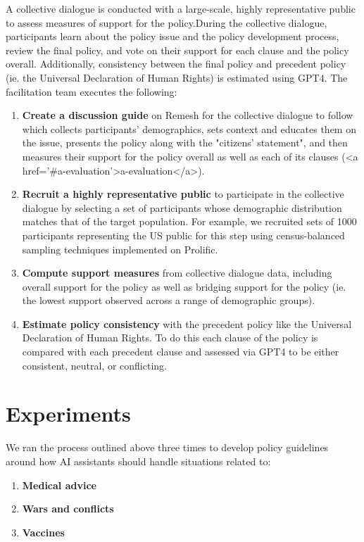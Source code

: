\documentclass{article}
\begin{document}
A collective dialogue is conducted with a large-scale, highly representative public to assess measures of support for the policy.During the collective dialogue, participants learn about the policy issue and the policy development process, review the final policy, and vote on their support for each clause and the policy overall. Additionally, consistency between the final policy and precedent policy (ie. the Universal Declaration of Human Rights) is estimated using GPT4. The facilitation team executes the following:

\begin{enumerate}
\item \textbf{Create a discussion guide} on Remesh for the collective dialogue to follow which collects participants' demographics, sets context and educates them on the issue, presents the policy along with the "citizens' statement", and then measures their support for the policy overall as well as each of its clauses (<a href='#a-evaluation'>a-evaluation</a>). 
\item \textbf{Recruit a highly representative public} to participate in the collective dialogue by selecting a set of participants whose demographic distribution matches that of the target population. For example, we recruited sets of 1000 participants representing the US public for this step using census-balanced sampling techniques implemented on Prolific.
\item \textbf{Compute support measures} from collective dialogue data, including overall support for the policy as well as bridging support for the policy (ie. the lowest support observed across a range of demographic groups). 
\item \textbf{Estimate policy consistency} with the precedent policy like the Universal Declaration of Human Rights. To do this each clause of the policy is compared with each precedent clause and assessed via GPT4 to be either consistent, neutral, or conflicting. 
\end{enumerate}



\section{Experiments}
We ran the process outlined above three times to develop policy guidelines around how AI assistants should handle situations related to:
\begin{enumerate}
\item \textbf{Medical advice}
\item \textbf{Wars and conflicts}
\item \textbf{Vaccines}
\end{enumerate}
\end{document}
